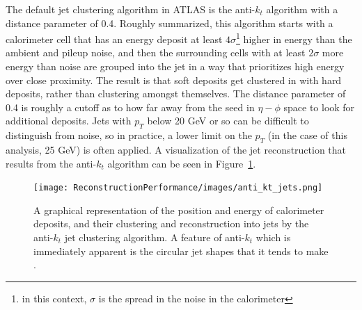 The default jet clustering algorithm in ATLAS is the anti-$k_t$ algorithm \cite{antikt}
with a distance parameter of 0.4.  Roughly summarized, this algorithm starts with a calorimeter cell that 
has an energy deposit at least $4\sigma$\footnote{in this context, $\sigma$ is the spread in the
noise in the calorimeter}
higher in energy than the ambient and pileup noise, 
and then the surrounding cells with at least $2\sigma$ more energy than noise are grouped into 
the jet in a way that prioritizes high energy over close proximity.  The result is that soft deposits get 
clustered in with hard deposits, rather than clustering amongst themselves.  The distance parameter of 0.4 is 
roughly a cutoff as to how far away from the seed in $\eta-\phi$ space to look for 
additional deposits.   Jets with $p_T$ below 20 GeV or so can be difficult to distinguish from noise, so in practice, a lower limit on 
the $p_T$ (in the case of this analysis, 25 GeV) is often applied.  A visualization of the jet reconstruction that results
from the anti-$k_t$ algorithm can be seen in Figure~\ref{fig:anti_kt_jets}.


\begin{figure}
    \center
	\texttt{[image: ReconstructionPerformance/images/anti\_kt\_jets.png]}
	\caption{A graphical representation of the position and energy of calorimeter deposits, and their clustering and reconstruction into jets by the anti-$k_t$ jet clustering algorithm.  A feature of anti-$k_t$ which is immediately apparent is the circular jet shapes that it tends to make \cite{antikt}.  \label{fig:anti_kt_jets}  }
\end{figure}







